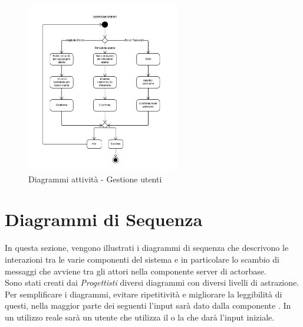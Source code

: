 \documentclass{scalatekids-article}
\begin{document}
\begin{figure}[H]
  \begin{center}
    \includegraphics[width=0.6\textwidth, keepaspectratio]{img/diagrammiAttivita/gestioneUtenti.jpeg}
    \caption{Diagrammi attività - Gestione utenti}
  \end{center}
\end{figure}

\section{Diagrammi di Sequenza}

In questa sezione, vengono illustrati i diagrammi di sequenza che descrivono
le interazioni tra le varie componenti del sistema e in particolare lo scambio
di messaggi che avviene tra gli attori nella componente server di actorbase.\\
Sono stati creati dai \textit{Progettisti} diversi diagrammi con diversi livelli
di astrazione.\\
Per semplificare i diagrammi, evitare ripetitività e migliorare la leggibilità di
questi, nella maggior parte dei seguenti l'input sarà dato dalla componente . In un utilizzo reale sarà un utente che utilizza il  o la
 che darà l'input iniziale.
\end{document}

